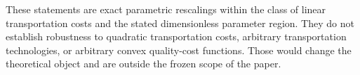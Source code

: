 These statements are exact parametric rescalings within the class of linear transportation costs and the stated dimensionless parameter region. They do not establish robustness to quadratic transportation costs, arbitrary transportation technologies, or arbitrary convex quality-cost functions. Those would change the theoretical object and are outside the frozen scope of the paper.
